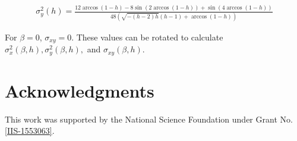 {\tiny
\begin{align}
\sigma_y^2(h)=
\frac{12 \arccos(1-h)-8 \sin \left(2 \arccos(1-h)\right)+\sin \left(4 \arccos(1-h)\right)}{48 \left(\sqrt{-(h-2) h} (h-1)+\arccos(1-h)\right)}
\end{align}}

For $\beta = 0$, $\sigma_{xy}=0$. These values can be rotated to calculate $\sigma_x^2(\beta,h),\sigma_y^2(\beta,h),$ and $\sigma_{xy}(\beta,h)$.

\section*{Acknowledgments}
This work was supported by the National Science Foundation under Grant No.\ \href{http://nsf.gov/awardsearch/showAward?AWD_ID=1553063}{ [IIS-1553063]}.


\footnotesize

%



